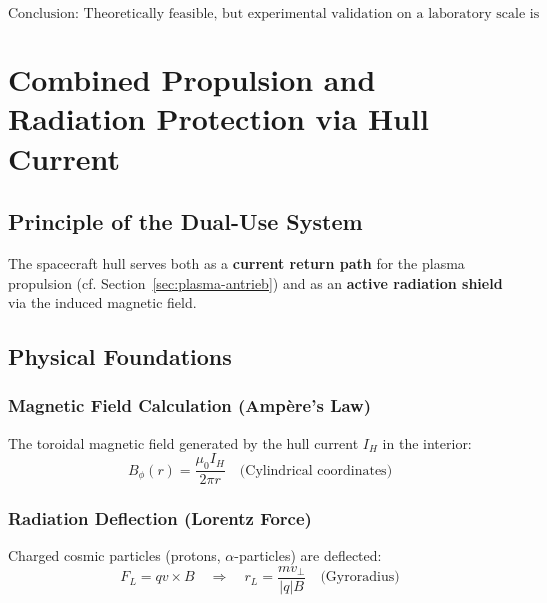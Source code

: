 \begin{equation}
    \text{Conclusion: } \boxed{\text{Theoretically feasible, but experimental validation on a laboratory scale is necessary.}}
\end{equation}

\section{Combined Propulsion and Radiation Protection via Hull Current}
\label{sec:hullcurrent}

\subsection{Principle of the Dual-Use System}
The spacecraft hull serves both as a \textbf{current return path} for the plasma propulsion (cf. Section~\ref{sec:plasma-antrieb}) and as an \textbf{active radiation shield} via the induced magnetic field.

\subsection{Physical Foundations}
\subsubsection*{Magnetic Field Calculation (Ampère's Law)}
The toroidal magnetic field generated by the hull current $I_H$ in the interior:
\begin{equation}
    B_\phi(r) = \frac{\mu_0 I_H}{2\pi r} \quad \text{(Cylindrical coordinates)}
    \label{eq:bfield}
\end{equation}

\subsubsection*{Radiation Deflection (Lorentz Force)}
Charged cosmic particles (protons, $\alpha$-particles) are deflected:
\begin{equation}
    F_L = q v \times B \quad \Rightarrow \quad r_L = \frac{m v_\perp}{|q| B} \quad \text{(Gyroradius)}
    \label{eq:lorentz}
\end{equation}

